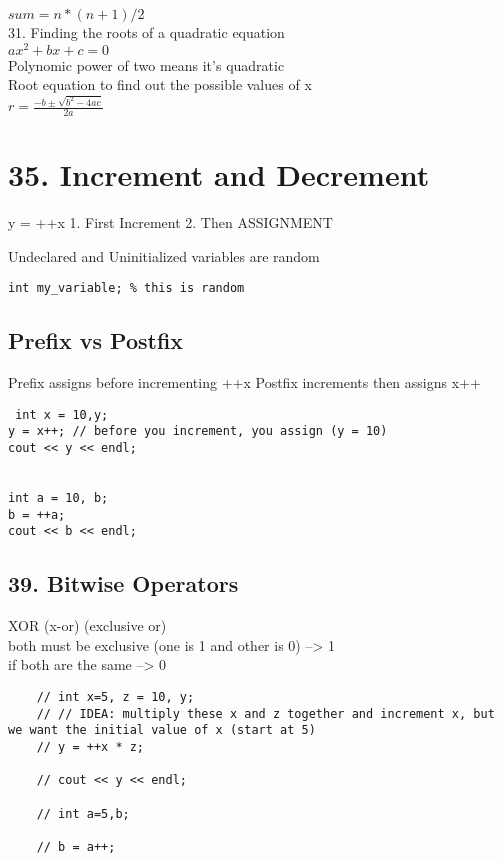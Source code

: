 \documentclass[a4paper,12pt]{book}
\begin{document}
$sum = n * (n+1) / 2$ \\ 


31. Finding the roots of a quadratic equation \\
$ax^{2} + bx + c = 0$ \\ 
Polynomic power of two means it's quadratic \\ 
Root equation to find out the possible values of x \\ 
$r=\frac{-b\pm\sqrt{b^2-4ac}}{2a}$




\chapter{35. Increment and Decrement}

y = ++x
1. First Increment
2. Then ASSIGNMENT



Undeclared and Uninitialized variables are random

\begin{lstlisting}
int my_variable; % this is random
\end{lstlisting}

\section{Prefix vs Postfix}
Prefix assigns before incrementing ++x 
Postfix increments then assigns  x++



\begin{lstlisting}   
 int x = 10,y;
y = x++; // before you increment, you assign (y = 10)
cout << y << endl;


int a = 10, b;
b = ++a;
cout << b << endl;

\end{lstlisting}

\section{39. Bitwise Operators} 

XOR (x-or) (exclusive or) \\
both must be exclusive (one is 1 and other is 0) --> 1 \\
if both are the same --> 0 \\

\begin{lstlisting}
    // int x=5, z = 10, y;
    // // IDEA: multiply these x and z together and increment x, but we want the initial value of x (start at 5)
    // y = ++x * z;

    // cout << y << endl;
 
    // int a=5,b;

    // b = a++;
\end{lstlisting}
\end{document}
